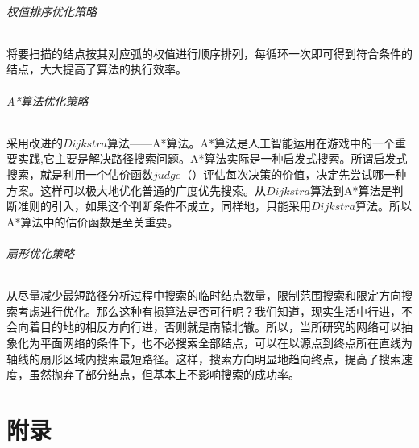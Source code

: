 \documentclass[a4paper,10pt]{ctexart}
\begin{document}
\paragraph{权值排序优化策略}
将要扫描的结点按其对应弧的权值进行顺序排列，每循环一次即可得到符合条件的结点，大大提高了算法的执行效率。
\paragraph{A*算法优化策略}
采用改进的$Dijkstra$算法——A*算法。A*算法是人工智能运用在游戏中的一个重要实践,它主要是解决路径搜索问题。A*算法实际是一种启发式搜索。所谓启发式搜索，就是利用一个估价函数$judge（）$评估每次决策的价值，决定先尝试哪一种方案。这样可以极大地优化普通的广度优先搜索。从$Dijkstra$算法到A*算法是判断准则的引入，如果这个判断条件不成立，同样地，只能采用$Dijkstra$算法。所以A*算法中的估价函数是至关重要。
\paragraph{扇形优化策略}
从尽量减少最短路径分析过程中搜索的临时结点数量，限制范围搜索和限定方向搜索考虑进行优化。那么这种有损算法是否可行呢？我们知道，现实生活中行进，不会向着目的地的相反方向行进，否则就是南辕北辙。所以，当所研究的网络可以抽象化为平面网络的条件下，也不必搜索全部结点，可以在以源点到终点所在直线为轴线的扇形区域内搜索最短路径。这样，搜索方向明显地趋向终点，提高了搜索速度，虽然抛弃了部分结点，但基本上不影响搜索的成功率。

\newpage
\appendix
\part{附录}
\end{document}
